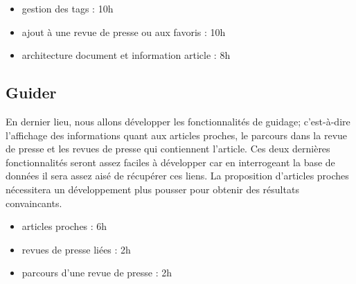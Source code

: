 		\begin{itemize}
			\item gestion des tags : 10h
			\item ajout à une revue de presse ou aux favoris : 10h
			\item architecture document et information article : 8h
		\end{itemize}

	\subsection{Guider}
		En dernier lieu, nous allons développer les fonctionnalités de guidage; c'est-à-dire l'affichage des informations quant aux articles proches, le parcours dans la revue de presse et les revues de presse qui contiennent l'article. Ces deux dernières fonctionnalités seront assez faciles à développer car en interrogeant la base de données il sera assez aisé de récupérer ces liens. La proposition d'articles proches nécessitera un développement plus pousser pour obtenir des résultats convaincants.

		\begin{itemize}
			\item articles proches : 6h
			\item revues de presse liées : 2h
			\item parcours d'une revue de presse : 2h
		\end{itemize}